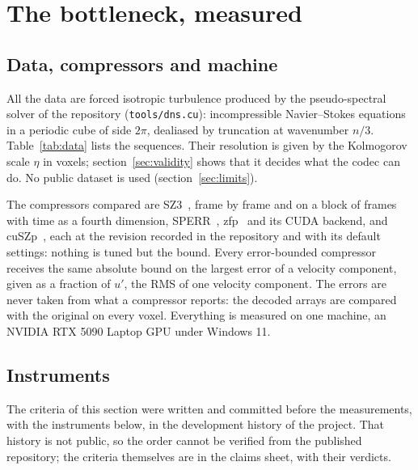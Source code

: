 \documentclass[11pt,a4paper]{article}
\newcommand{\urms}{u'}
\begin{document}
\section{The bottleneck, measured}
\label{sec:bottleneck}

\subsection{Data, compressors and machine}

All the data are forced isotropic turbulence produced by the pseudo-spectral solver of the repository
(\texttt{tools/dns.cu}): incompressible Navier--Stokes equations in a periodic cube of side $2\pi$, dealiased by
truncation at wavenumber $n/3$. Table~\ref{tab:data} lists the sequences. Their resolution is given by the Kolmogorov
scale $\eta$ in voxels; section~\ref{sec:validity} shows that it decides what the codec can do. No public dataset is
used (section~\ref{sec:limits}).

\begin{table}[t]
  \centering
  
  \caption{The sequences. $Re_\lambda$ is the Taylor-scale Reynolds number and $\eta$ the Kolmogorov scale, both as
  the solver records them in the header of each sequence. The sweep is made of six viscosities and three solver seeds
  each.}
  \label{tab:data}
\end{table}

The compressors compared are SZ3~\cite{liang2023sz3}, frame by frame and on a block of frames with time as a fourth
dimension, SPERR~\cite{li2023lossy}, zfp~\cite{lindstrom2014fixed} and its CUDA backend, and
cuSZp~\cite{huang2023cuszp}, each at the revision recorded in the repository and with its default settings: nothing
is tuned but the bound. Every error-bounded compressor receives the same absolute bound on the largest error of a
velocity component, given as a fraction of $\urms$, the RMS of one velocity component. The errors are never taken
from what a compressor reports: the decoded arrays are compared with the original on every voxel. Everything is
measured on one machine, an NVIDIA RTX 5090 Laptop GPU under Windows 11.

\subsection{Instruments}

The criteria of this section were written and committed before the measurements, with the instruments below, in the
development history of the project. That history is not public, so the order cannot be verified from the published
repository; the criteria themselves are in the claims sheet, with their verdicts.
\end{document}
